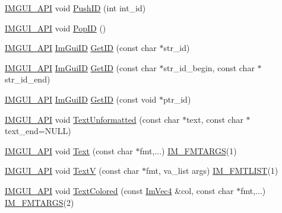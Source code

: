 \begin{DoxyCompactItemize}
\mbox{\hyperlink{imgui_8h_a43829975e84e45d1149597467a14bbf5}{I\+M\+G\+U\+I\+\_\+\+A\+PI}} void \mbox{\hyperlink{namespace_im_gui_a6a11664be2a0b9a0e7054bb339e009ac}{Push\+ID}} (int int\+\_\+id)
\item 
\mbox{\hyperlink{imgui_8h_a43829975e84e45d1149597467a14bbf5}{I\+M\+G\+U\+I\+\_\+\+A\+PI}} void \mbox{\hyperlink{namespace_im_gui_aba0b2d8f890a5d435ae43d0c4a2d4dd1}{Pop\+ID}} ()
\item 
\mbox{\hyperlink{imgui_8h_a43829975e84e45d1149597467a14bbf5}{I\+M\+G\+U\+I\+\_\+\+A\+PI}} \mbox{\hyperlink{imgui_8h_a1785c9b6f4e16406764a85f32582236f}{Im\+Gui\+ID}} \mbox{\hyperlink{namespace_im_gui_a3329b04bd4235e90ad9deb00ffb38ae4}{Get\+ID}} (const char $\ast$str\+\_\+id)
\item 
\mbox{\hyperlink{imgui_8h_a43829975e84e45d1149597467a14bbf5}{I\+M\+G\+U\+I\+\_\+\+A\+PI}} \mbox{\hyperlink{imgui_8h_a1785c9b6f4e16406764a85f32582236f}{Im\+Gui\+ID}} \mbox{\hyperlink{namespace_im_gui_a26064d74efebef3aa86e1a78b3e4c333}{Get\+ID}} (const char $\ast$str\+\_\+id\+\_\+begin, const char $\ast$str\+\_\+id\+\_\+end)
\item 
\mbox{\hyperlink{imgui_8h_a43829975e84e45d1149597467a14bbf5}{I\+M\+G\+U\+I\+\_\+\+A\+PI}} \mbox{\hyperlink{imgui_8h_a1785c9b6f4e16406764a85f32582236f}{Im\+Gui\+ID}} \mbox{\hyperlink{namespace_im_gui_a220123ad62c2180ded92b2ef91f27c5a}{Get\+ID}} (const void $\ast$ptr\+\_\+id)
\item 
\mbox{\hyperlink{imgui_8h_a43829975e84e45d1149597467a14bbf5}{I\+M\+G\+U\+I\+\_\+\+A\+PI}} void \mbox{\hyperlink{namespace_im_gui_a96a5f42789ecc419b2ae8af7b2acc28e}{Text\+Unformatted}} (const char $\ast$text, const char $\ast$text\+\_\+end=N\+U\+LL)
\item 
\mbox{\hyperlink{imgui_8h_a43829975e84e45d1149597467a14bbf5}{I\+M\+G\+U\+I\+\_\+\+A\+PI}} void \mbox{\hyperlink{namespace_im_gui_a9e7b83611fe441d54fad2effb4bf4965}{Text}} (const char $\ast$fmt,...) \mbox{\hyperlink{imgui_8h_a1251c2f9ddac0873dbad8181bd82c9f1}{I\+M\+\_\+\+F\+M\+T\+A\+R\+GS}}(1)
\item 
\mbox{\hyperlink{imgui_8h_a43829975e84e45d1149597467a14bbf5}{I\+M\+G\+U\+I\+\_\+\+A\+PI}} void \mbox{\hyperlink{namespace_im_gui_a10a0d6362178c2f743092f21e1b6cd20}{TextV}} (const char $\ast$fmt, va\+\_\+list args) \mbox{\hyperlink{imgui_8h_a047693beb7f899f5deab1e20202016b3}{I\+M\+\_\+\+F\+M\+T\+L\+I\+ST}}(1)
\item 
\mbox{\hyperlink{imgui_8h_a43829975e84e45d1149597467a14bbf5}{I\+M\+G\+U\+I\+\_\+\+A\+PI}} void \mbox{\hyperlink{namespace_im_gui_a36ab8fcad68b26863d6e910755de04c2}{Text\+Colored}} (const \mbox{\hyperlink{struct_im_vec4}{Im\+Vec4}} \&col, const char $\ast$fmt,...) \mbox{\hyperlink{imgui_8h_a1251c2f9ddac0873dbad8181bd82c9f1}{I\+M\+\_\+\+F\+M\+T\+A\+R\+GS}}(2)

\end{DoxyCompactItemize}
